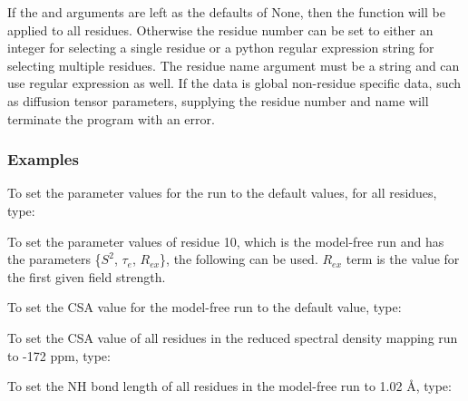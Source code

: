  If the  and  arguments are left as the defaults of None, then the function will be applied to all residues.  Otherwise the residue number can be set to either an integer for selecting a single residue or a python regular expression string for selecting multiple residues.  The residue name argument must be a string and can use regular expression as well.  If the data is global non-residue specific data, such as diffusion tensor parameters, supplying the residue number and name will terminate the program with an error. 
  

  
 \subsubsection{Examples} 

 To set the parameter values for the run  to the default values, for all residues, type: 
  


 To set the parameter values of residue 10, which is the model-free run  and has the parameters \{$S^2$, $\tau_e$, $R_{ex}$\}, the following can be used.  $R_{ex}$ term is the value for the first given field strength. 
  



 To set the CSA value for the model-free run  to the default value, type: 
  


 To set the CSA value of all residues in the reduced spectral density mapping run  to -172 ppm, type: 
  



 To set the NH bond length of all residues in the model-free run  to 1.02 \AA, type: 
  



